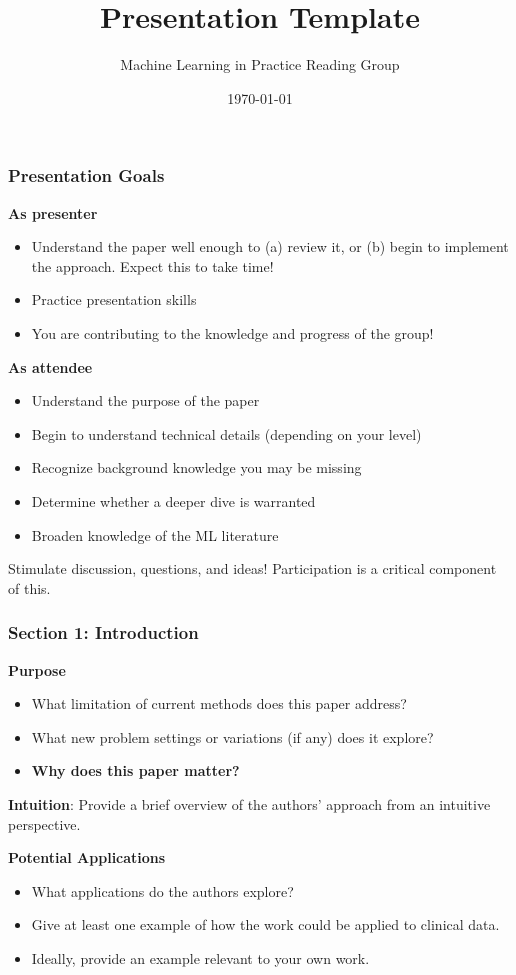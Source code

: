 \documentclass[10pt, aspectratio=169]{beamer}
\title[Presentation Template]{Presentation Template}
\author[ML in Practice]{Machine Learning in Practice Reading Group}
\institute{Duke B\&B}
\date{\today}
\begin{document}
\begin{frame}
\titlepage
{}
\end{frame}

\begin{frame}
\frametitle{Presentation Goals}
\textbf{As presenter}
\begin{itemize}
    \item Understand the paper well enough to (a) review it, or (b) begin to implement the approach. Expect this to take time!
    \item Practice presentation skills
    \item You are contributing to the knowledge and progress of the group!
\end{itemize}

\vspace{1em}
\textbf{As attendee}
\begin{itemize}
    \item Understand the purpose of the paper
    \item Begin to understand technical details (depending on your level)
    \item Recognize background knowledge you may be missing
    \item Determine whether a deeper dive is warranted
    \item Broaden knowledge of the ML literature
\end{itemize}

\vspace{1em}
Stimulate discussion, questions, and ideas! Participation is a critical component of this.
\end{frame}

\begin{frame}
\frametitle{Section 1: Introduction}
\textbf{Purpose}
\begin{itemize}
    \item What limitation of current methods does this paper address?
    \item What new problem settings or variations (if any) does it explore?
    \item \textbf{Why does this paper matter?}
\end{itemize}

\vspace{2em}
\textbf{Intuition}: Provide a brief overview of the authors' approach from an intuitive perspective.

\vspace{2em}
\textbf{Potential Applications}
\begin{itemize}
    \item What applications do the authors explore?
    \item Give at least one example of how the work could be applied to clinical data.
    \item Ideally, provide an example relevant to your own work.
\end{itemize}
\end{frame}
\end{document}
